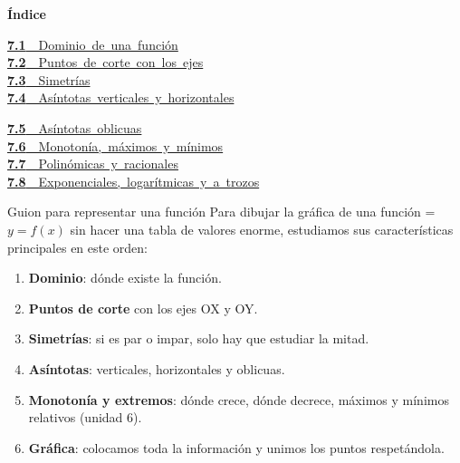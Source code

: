 \documentclass[11pt,a4paper]{article}
\newcommand{\fmm}[1]{\setbox0=\hbox{$#1$}\ifdim\wd0>\linewidth\[#1\]\else\mbox{\box0}\fi}
\begin{document}
\begin{tcolorbox}[colback=fmsurface,colframe=fmsurface,arc=3mm,left=4mm,right=4mm,top=2mm,bottom=2mm]
\small\textbf{Índice}\par\smallskip
\begin{minipage}[t]{0.49\linewidth}\small \mbox{\hyperlink{sec1}{\textbf{\color{fmgreen}7.1}\ \ Dominio de una función}}\\[3pt]
\mbox{\hyperlink{sec2}{\textbf{\color{fmgreen}7.2}\ \ Puntos de corte con los ejes}}\\[3pt]
\mbox{\hyperlink{sec3}{\textbf{\color{fmgreen}7.3}\ \ Simetrías}}\\[3pt]
\mbox{\hyperlink{sec4}{\textbf{\color{fmgreen}7.4}\ \ Asíntotas verticales y horizontales}}\\[3pt]\end{minipage}\hfill\begin{minipage}[t]{0.49\linewidth}\small \mbox{\hyperlink{sec5}{\textbf{\color{fmgreen}7.5}\ \ Asíntotas oblicuas}}\\[3pt]
\mbox{\hyperlink{sec6}{\textbf{\color{fmgreen}7.6}\ \ Monotonía, máximos y mínimos}}\\[3pt]
\mbox{\hyperlink{sec7}{\textbf{\color{fmgreen}7.7}\ \ Polinómicas y racionales}}\\[3pt]
\mbox{\hyperlink{sec8}{\textbf{\color{fmgreen}7.8}\ \ Exponenciales, logarítmicas y a trozos}}\\[3pt]\end{minipage}
\end{tcolorbox}
\vspace*{0.4cm}

\begin{fmprop}{Guion para representar una función}
Para dibujar la gráfica de una función \fmm{y=f(x)} sin hacer una tabla de valores enorme, estudiamos sus características principales en este orden:

    
\begin{enumerate}
\item \textbf{Dominio}: dónde existe la función.
\item \textbf{Puntos de corte} con los ejes OX y OY.
\item \textbf{Simetrías}: si es par o impar, solo hay que estudiar la mitad.
\item \textbf{Asíntotas}: verticales, horizontales y oblicuas.
\item \textbf{Monotonía y extremos}: dónde crece, dónde decrece, máximos y mínimos relativos (unidad 6).
\item \textbf{Gráfica}: colocamos toda la información y unimos los puntos respetándola.
\end{enumerate}
\end{fmprop}
\end{document}
